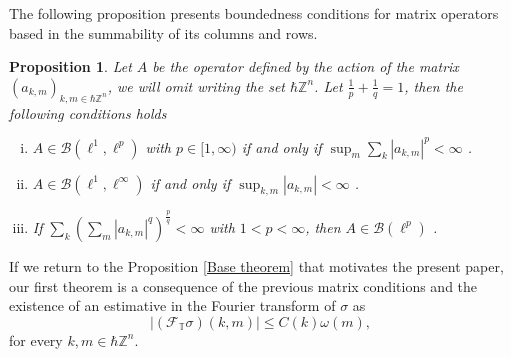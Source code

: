 \documentclass[pdflatex,sn-mathphys-num]{sn-jnl}%
\theoremstyle{thmstyleone}%
\newtheorem{proposition}[theorem]{Proposition}
\theoremstyle{thmstyletwo}%
\theoremstyle{thmstylethree}%
\begin{document}
The following proposition presents boundedness conditions for matrix operators based in the summability of its columns and rows.

\begin{proposition}\label{general bounded criterion}
    Let $A$ be the operator defined by the action of the matrix $(a_{k,m})_{k,m\in\hbar\mathbb{Z}^n}$, we will omit writing the set $\hbar\mathbb{Z}^n$. Let $\frac{1}{p}+\frac{1}{q}=1$, then the following conditions holds
    \begin{enumerate}[(i)]
        \item $A\in\mathcal{B}(\ell^1,\ell^p)$ with $p\in[1,\infty)$ if and only if $\sup_{m}\sum_{k}|a_{k,m}|^p <\infty$ \cite[Theorem 5]{maddox1988elements}.\label{Matrix theorem i}
        \item $A\in\mathcal{B}(\ell^1,\ell^\infty)$ if and only if $\sup_{k,m} |a_{k,m}| <\infty$ \cite[Theorem 5]{maddox1988elements}.\label{Matrix theorem ii}
        \item If $\sum_k\left(\sum_m |a_{k,m}|^q\right)^{\frac{p}{q}}<\infty$ with $1<p<\infty$, then $A\in\mathcal{B}(\ell^p)$ \cite{borwein1979matrix}.\label{Matrix theorem iv} 
    \end{enumerate}
\end{proposition}

 If we return to the Proposition \ref{Base theorem} that motivates the present paper, our first theorem is a consequence of the previous matrix conditions and the existence of an estimative in the Fourier transform of $\sigma$ as
 \begin{equation}\label{fourier inequality}
     |(\mathcal{F}_{\mathbb{T}} \sigma)(k,m)|\leq C(k)\omega(m),
 \end{equation}
for every $k,m\in\hbar\mathbb{Z}^n$.
\end{document}

